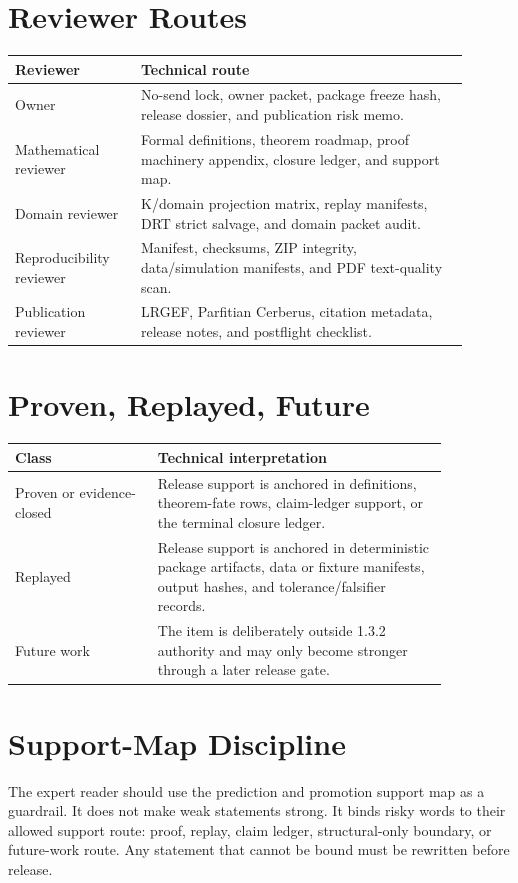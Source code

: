 \documentclass[11pt,a4paper]{article}
\begin{document}
\section*{Reviewer Routes}
\begin{longtable}{>{\raggedright\arraybackslash}p{0.25\linewidth}>{\raggedright\arraybackslash}p{0.65\linewidth}}
\textbf{Reviewer} & \textbf{Technical route}\\
\hline
Owner & No-send lock, owner packet, package freeze hash, release dossier, and publication risk memo.\\
Mathematical reviewer & Formal definitions, theorem roadmap, proof machinery appendix, closure ledger, and support map.\\
Domain reviewer & K/domain projection matrix, replay manifests, DRT strict salvage, and domain packet audit.\\
Reproducibility reviewer & Manifest, checksums, ZIP integrity, data/simulation manifests, and PDF text-quality scan.\\
Publication reviewer & LRGEF, Parfitian Cerberus, citation metadata, release notes, and postflight checklist.\\
\end{longtable}

\section*{Proven, Replayed, Future}
\begin{longtable}{>{\raggedright\arraybackslash}p{0.28\linewidth}>{\raggedright\arraybackslash}p{0.58\linewidth}}
\textbf{Class} & \textbf{Technical interpretation}\\
\hline
Proven or evidence-closed & Release support is anchored in definitions, theorem-fate rows, claim-ledger support, or the terminal closure ledger.\\
Replayed & Release support is anchored in deterministic package artifacts, data or fixture manifests, output hashes, and tolerance/falsifier records.\\
Future work & The item is deliberately outside 1.3.2 authority and may only become stronger through a later release gate.\\
\end{longtable}

\section*{Support-Map Discipline}
The expert reader should use the prediction and promotion support map as a guardrail. It does not make weak statements strong. It binds risky words to their allowed support route: proof, replay, claim ledger, structural-only boundary, or future-work route. Any statement that cannot be bound must be rewritten before release.
\end{document}
